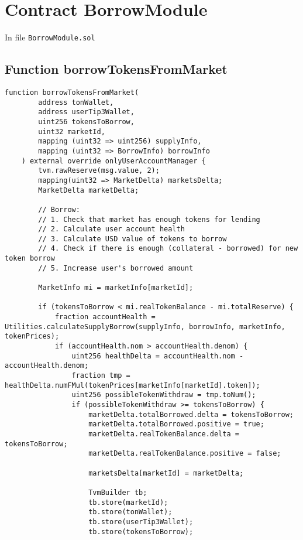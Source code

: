 
\bigskip

\section{Contract BorrowModule}

In file {\tt BorrowModule.sol}

\subsection{Function borrowTokensFromMarket}

\begin{lstlisting}[firstnumber=74]
    function borrowTokensFromMarket(
        address tonWallet,
        address userTip3Wallet,
        uint256 tokensToBorrow,
        uint32 marketId,
        mapping (uint32 => uint256) supplyInfo,
        mapping (uint32 => BorrowInfo) borrowInfo
    ) external override onlyUserAccountManager {
        tvm.rawReserve(msg.value, 2);
        mapping(uint32 => MarketDelta) marketsDelta;
        MarketDelta marketDelta;
        
        // Borrow:
        // 1. Check that market has enough tokens for lending
        // 2. Calculate user account health
        // 3. Calculate USD value of tokens to borrow
        // 4. Check if there is enough (collateral - borrowed) for new token borrow
        // 5. Increase user's borrowed amount

        MarketInfo mi = marketInfo[marketId];

        if (tokensToBorrow < mi.realTokenBalance - mi.totalReserve) {
            fraction accountHealth = Utilities.calculateSupplyBorrow(supplyInfo, borrowInfo, marketInfo, tokenPrices);
            if (accountHealth.nom > accountHealth.denom) {
                uint256 healthDelta = accountHealth.nom - accountHealth.denom;
                fraction tmp = healthDelta.numFMul(tokenPrices[marketInfo[marketId].token]);
                uint256 possibleTokenWithdraw = tmp.toNum();
                if (possibleTokenWithdraw >= tokensToBorrow) {
                    marketDelta.totalBorrowed.delta = tokensToBorrow;
                    marketDelta.totalBorrowed.positive = true;
                    marketDelta.realTokenBalance.delta = tokensToBorrow;
                    marketDelta.realTokenBalance.positive = false;

                    marketsDelta[marketId] = marketDelta;

                    TvmBuilder tb;
                    tb.store(marketId);
                    tb.store(tonWallet);
                    tb.store(userTip3Wallet);
                    tb.store(tokensToBorrow);


\end{lstlisting}
